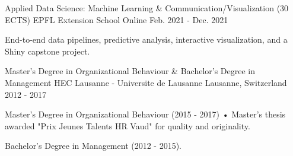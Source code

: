 \begin{cventries}
  \cventry
    {Applied Data Science: Machine Learning \& Communication/Visualization (30 ECTS)}
    {EPFL Extension School}
    {Online}
    {Feb. 2021 - Dec. 2021}
    {
      \begin{cvitems}
        \item {End-to-end data pipelines, predictive analysis, interactive visualization, and a Shiny capstone project.}
      \end{cvitems}
    }

  \cventry
    {Master's Degree in Organizational Behaviour \& Bachelor's Degree in Management}
    {HEC Lausanne - Universite de Lausanne}
    {Lausanne, Switzerland}
    {2012 - 2017}
    {
      \begin{cvitems}
        \item {Master's Degree in Organizational Behaviour (2015 - 2017) • Master's thesis awarded "Prix Jeunes Talents HR Vaud" for quality and originality.}
        \item {Bachelor's Degree in Management (2012 - 2015).}
      \end{cvitems}
    }
\end{cventries}
